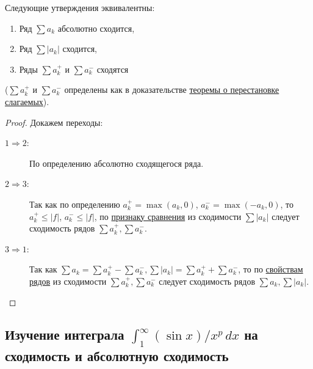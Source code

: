 \begin{ntheorem}[из будущего]
	Следующие утверждения эквивалентны:
	\begin{enumerate}
		\item Ряд \(\sum a_k\) абсолютно сходится,
		\item Ряд \(\sum |a_k|\) сходится,
		\item Ряды \(\sum a_k^+\) и \(\sum a_k^-\) сходятся
	\end{enumerate}
	\big(\(\sum a_k^+\) и \(\sum a_k^-\) определены как в доказательстве \hyperlink{теорема о перестановке слагаемых}{теоремы о перестановке слагаемых}\big).
\end{ntheorem}
\begin{proof}
	Докажем переходы:
	\begin{description}
		\item[\(1 \Rightarrow 2\):] По определению абсолютно сходящегося ряда.
		\item[\(2 \Rightarrow 3\):] Так как по определению \(a_k^+ = \max (a_k, 0)\), \(a_k^- = \max (-a_k, 0)\), то \(a_k^+ \leqslant |f|\), \(a_k^- \leqslant |f|\), по \hyperlink{признак сравнения рядов}{признаку сравнения} из сходимости \(\sum |a_k|\) следует сходимость рядов \(\sum a_k^+, \sum a_k^-\).
		\item[\(3 \Rightarrow 1\):] Так как \(\sum a_k = \sum a_k^+ - \sum a_k^-, \sum |a_k| = \sum a_k^+ + \sum a_k^-\), то по \hyperlink{свойства рядов}{свойствам рядов} из сходимости \(\sum a_k^+, \sum a_k^-\) следует сходимость рядов \(\sum a_k, \sum |a_k|\).
	\end{description}
\end{proof}

\subsection{Изучение интеграла $\int_1^{\infty} (\sin x)/{x^p} \, dx$ на сходимость и абсолютную сходимость}

